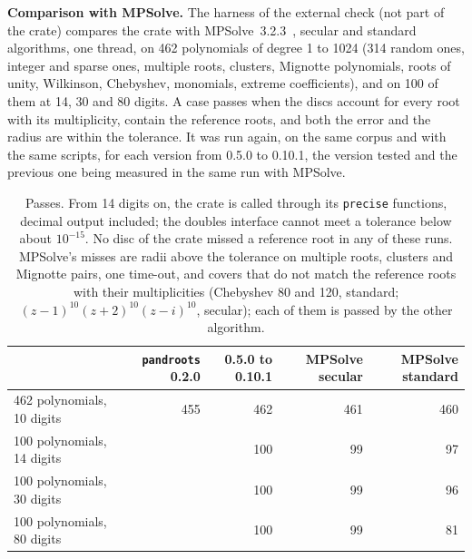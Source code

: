 \documentclass[10pt,a4paper]{article}
\theoremstyle{definition}
\numberwithin{equation}{section}
\begin{document}
\textbf{Comparison with MPSolve.} The harness of the external check (not part of the crate) compares the
crate with MPSolve~3.2.3~\cite{mpsolve}, secular and standard algorithms, one thread, on 462 polynomials of
degree 1 to 1024 (314 random ones, integer and sparse ones, multiple roots, clusters, Mignotte
polynomials, roots of unity, Wilkinson, Chebyshev, monomials, extreme coefficients), and on 100 of them at
14, 30 and 80 digits. A case passes when the discs account for every root with its multiplicity, contain
the reference roots, and both the error and the radius are within the tolerance. It was run again, on
the same corpus and with the same scripts, for each version from 0.5.0 to 0.10.1, the version tested and
the previous one being measured in the same run with MPSolve.
\begin{table}[H]\centering\small
\begin{tabular}{lrrrr}
\toprule
 & \texttt{pandroots} 0.2.0 & 0.5.0 to 0.10.1 & MPSolve secular & MPSolve standard\\
\midrule
462 polynomials, 10 digits & 455 & 462 & 461 & 460\\
100 polynomials, 14 digits & & 100 & 99 & 97\\
100 polynomials, 30 digits & & 100 & 99 & 96\\
100 polynomials, 80 digits & & 100 & 99 & 81\\
\bottomrule
\end{tabular}
\caption{Passes. From 14 digits on, the crate is called through its \texttt{precise} functions, decimal
output included; the doubles interface cannot meet a tolerance below about $10^{-15}$. No disc of the
crate missed a reference root in any of these runs. MPSolve's misses are radii above the tolerance on
multiple roots, clusters and Mignotte pairs, one time-out, and covers that do not match the reference
roots with their multiplicities (Chebyshev 80 and 120, standard; $(z-1)^{10}(z+2)^{10}(z-i)^{10}$,
secular); each of them is passed by the other algorithm.}\label{tab:mpsolve}
\end{table}
\end{document}

